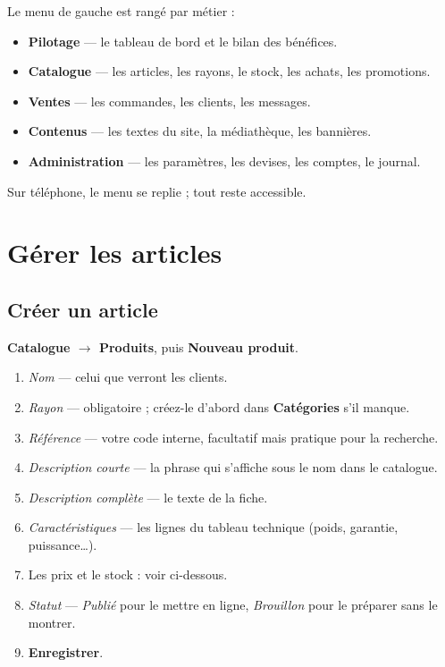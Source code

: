 \documentclass[11pt,a4paper]{article}
\newcommand{\bouton}[1]{\textbf{\textcolor{sig}{#1}}}
\newcommand{\menu}[1]{\textsf{\textbf{#1}}}
\newcommand{\champ}[1]{\textit{#1}}
\begin{document}
Le menu de gauche est rangé par métier :

\begin{itemize}
  \item \menu{Pilotage} — le tableau de bord et le bilan des bénéfices.
  \item \menu{Catalogue} — les articles, les rayons, le stock, les achats, les promotions.
  \item \menu{Ventes} — les commandes, les clients, les messages.
  \item \menu{Contenus} — les textes du site, la médiathèque, les bannières.
  \item \menu{Administration} — les paramètres, les devises, les comptes, le journal.
\end{itemize}

Sur téléphone, le menu se replie ; tout reste accessible.

\section{Gérer les articles}

\subsection{Créer un article}

\menu{Catalogue $\rightarrow$ Produits}, puis \bouton{Nouveau produit}.

\begin{enumerate}
  \item \champ{Nom} — celui que verront les clients.
  \item \champ{Rayon} — obligatoire ; créez-le d'abord dans \menu{Catégories} s'il manque.
  \item \champ{Référence} — votre code interne, facultatif mais pratique pour la recherche.
  \item \champ{Description courte} — la phrase qui s'affiche sous le nom dans le catalogue.
  \item \champ{Description complète} — le texte de la fiche.
  \item \champ{Caractéristiques} — les lignes du tableau technique (poids, garantie, puissance\ldots).
  \item Les prix et le stock : voir ci-dessous.
  \item \champ{Statut} — \textit{Publié} pour le mettre en ligne, \textit{Brouillon} pour le préparer sans le montrer.
  \item \bouton{Enregistrer}.
\end{enumerate}
\end{document}
